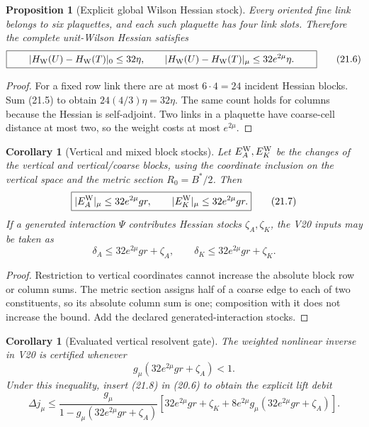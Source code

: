 \documentclass[11pt,oneside]{book}
\newtheorem{proposition}[theorem]{Proposition}
\newtheorem{corollary}[theorem]{Corollary}
\theoremstyle{definition}
\theoremstyle{remark}
\begin{document}
\begin{proposition}[Explicit global Wilson Hessian stock]
\label{prop:e8v21-H-stock}
Every oriented fine link belongs to six plaquettes, and each such
plaquette has four link slots.  Therefore the complete unit-Wilson
Hessian satisfies
\[
\boxed{\qquad
 |H_{\rm W}(U)-H_{\rm W}(T)|_0\leq32\eta,
\qquad
 |H_{\rm W}(U)-H_{\rm W}(T)|_\mu
 \leq32e^{2\mu}\eta.
\qquad}                                                           \tag{21.6}
\]
\end{proposition}

\begin{proof}
For a fixed row link there are at most \(6\cdot4=24\) incident Hessian
blocks.  Sum (21.5) to obtain \(24(4/3)\eta=32\eta\).
The same count holds for columns because the Hessian is self-adjoint.
Two links in a plaquette have coarse-cell distance at most two, so the
weight costs at most \(e^{2\mu}\).
\end{proof}

\begin{corollary}[Vertical and mixed block stocks]
\label{cor:e8v21-AK}
Let \(E_A^{\rm W},E_K^{\rm W}\) be the changes of the vertical and
vertical/coarse blocks, using the coordinate inclusion on the vertical
space and the metric section \(R_0=B^*/2\).  Then
\[
\boxed{
 |E_A^{\rm W}|_\mu\leq32e^{2\mu}gr,\qquad
 |E_K^{\rm W}|_\mu\leq32e^{2\mu}gr.}               \tag{21.7}
\]
If a generated interaction \(\Psi\) contributes Hessian stocks
\(\zeta_A,\zeta_K\), the V20 inputs may be taken as
\[
\boxed{
\delta_A\leq32e^{2\mu}gr+\zeta_A,\qquad
\delta_K\leq32e^{2\mu}gr+\zeta_K.}                 \tag{21.8}
\]
\end{corollary}

\begin{proof}
Restriction to vertical coordinates cannot increase the absolute
block row or column sums.  The metric section assigns half of a coarse
edge to each of two constituents, so its absolute column sum is one;
composition with it does not increase the bound.  Add the declared
generated-interaction stocks.
\end{proof}

\begin{corollary}[Evaluated vertical resolvent gate]
\label{cor:e8v21-resolvent-gate}
The weighted nonlinear inverse in V20 is certified whenever
\[
\boxed{\qquad
 g_\mu\left(32e^{2\mu}gr+\zeta_A\right)<1.
\qquad}                                                           \tag{21.9}
\]
Under this inequality, insert (21.8) in (20.6) to obtain the explicit
lift debit
\[
\Delta j_\mu\leq
\frac{g_\mu}{
 1-g_\mu(32e^{2\mu}gr+\zeta_A)}
\left[
32e^{2\mu}gr+\zeta_K
+8e^{2\mu}g_\mu(32e^{2\mu}gr+\zeta_A)
\right].                                                          \tag{21.10}
\]
\end{corollary}
\end{document}
